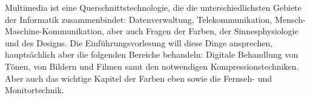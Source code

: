 \begin{module}
\begin{content}
Multimedia ist eine Querschnittstechnologie, die die unterschiedlichsten Gebiete der Informatik zusammenbindet: Datenverwaltung, Telekommunikation, Mensch-Maschine-Kommunikation, aber auch Fragen der Farben, der Sinnesphysiologie und des Designs.\newline
\newline
 Die Einführungsvorlesung will diese Dinge ansprechen, hauptsächlich aber die folgenden Bereiche behandeln:\newline
 Digitale Behandlung von Tönen, von Bildern und Filmen samt den notwendigen Kompressionstechniken. Aber auch das wichtige Kapitel der Farben eben sowie die Fernseh- und Monitortechnik.


\end{content}



\end{module}

